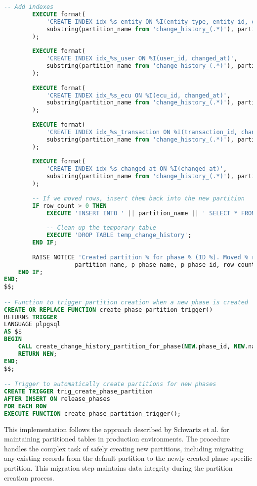 \begin{lstlisting}[language=SQL, caption={Automatic Partition Creation}, label={lst:auto-partition-creation}]
        -- Add indexes
        EXECUTE format(
            'CREATE INDEX idx_%s_entity ON %I(entity_type, entity_id, changed_at)',
            substring(partition_name from 'change_history_(.*)'), partition_name
        );
        
        EXECUTE format(
            'CREATE INDEX idx_%s_user ON %I(user_id, changed_at)',
            substring(partition_name from 'change_history_(.*)'), partition_name
        );
        
        EXECUTE format(
            'CREATE INDEX idx_%s_ecu ON %I(ecu_id, changed_at)',
            substring(partition_name from 'change_history_(.*)'), partition_name
        );
        
        EXECUTE format(
            'CREATE INDEX idx_%s_transaction ON %I(transaction_id, changed_at)',
            substring(partition_name from 'change_history_(.*)'), partition_name
        );
        
        EXECUTE format(
            'CREATE INDEX idx_%s_changed_at ON %I(changed_at)',
            substring(partition_name from 'change_history_(.*)'), partition_name
        );
        
        -- If we moved rows, insert them back into the new partition
        IF row_count > 0 THEN
            EXECUTE 'INSERT INTO ' || partition_name || ' SELECT * FROM temp_change_history';
            
            -- Clean up the temporary table
            EXECUTE 'DROP TABLE temp_change_history';
        END IF;
        
        RAISE NOTICE 'Created partition % for phase % (ID %). Moved % rows.', 
                    partition_name, p_phase_name, p_phase_id, row_count;
    END IF;
END;
$$;

-- Function to trigger partition creation when a new phase is created
CREATE OR REPLACE FUNCTION create_phase_partition_trigger()
RETURNS TRIGGER
LANGUAGE plpgsql
AS $$
BEGIN
    CALL create_change_history_partition_for_phase(NEW.phase_id, NEW.name);
    RETURN NEW;
END;
$$;

-- Trigger to automatically create partitions for new phases
CREATE TRIGGER trig_create_phase_partition
AFTER INSERT ON release_phases
FOR EACH ROW
EXECUTE FUNCTION create_phase_partition_trigger();
\end{lstlisting}

This implementation follows the approach described by Schwartz et al. \cite{schwartz2012high} for maintaining partitioned tables in production environments. The procedure handles the complex task of safely creating new partitions, including migrating any existing records from the default partition to the newly created phase-specific partition. This migration step maintains data integrity during the partition creation process.

